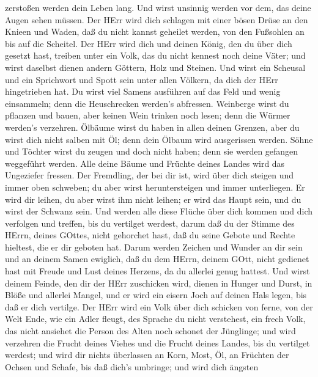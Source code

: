 zerstoßen werden dein Leben lang.  Und wirst unsinnig
werden vor dem, das deine Augen sehen müssen.  Der HErr
wird dich schlagen mit einer bösen Drüse an den Knieen und Waden, daß du
nicht kannst geheilet werden, von den Fußsohlen an bis auf die Scheitel.
 Der HErr wird dich und deinen König, den du über dich
gesetzt hast, treiben unter ein Volk, das du nicht kennest noch deine
Väter; und wirst daselbst dienen andern Göttern, Holz und Steinen.
 Und wirst ein Scheusal und ein Sprichwort und Spott sein
unter allen Völkern, da dich der HErr hingetrieben hat.  Du
wirst viel Samens ausführen auf das Feld und wenig einsammeln; denn die
Heuschrecken werden's abfressen.  Weinberge wirst du
pflanzen und bauen, aber keinen Wein trinken noch lesen; denn die Würmer
werden's verzehren.  Ölbäume wirst du haben in allen deinen
Grenzen, aber du wirst dich nicht salben mit Öl; denn dein Ölbaum wird
ausgerissen werden.  Söhne und Töchter wirst du zeugen und
doch nicht haben; denn sie werden gefangen weggeführt werden.
 Alle deine Bäume und Früchte deines Landes wird das
Ungeziefer fressen.  Der Fremdling, der bei dir ist, wird
über dich steigen und immer oben schweben; du aber wirst heruntersteigen
und immer unterliegen.  Er wird dir leihen, du aber wirst
ihm nicht leihen; er wird das Haupt sein, und du wirst der Schwanz sein.
 Und werden alle diese Flüche über dich kommen und dich
verfolgen und treffen, bis du vertilget werdest, darum daß du der Stimme
des HErrn, deines GOttes, nicht gehorchet hast, daß du seine Gebote und
Rechte hieltest, die er dir geboten hat.  Darum werden
Zeichen und Wunder an dir sein und an deinem Samen ewiglich,
 daß du dem HErrn, deinem GOtt, nicht gedienet hast mit
Freude und Lust deines Herzens, da du allerlei genug hattest.
 Und wirst deinem Feinde, den dir der HErr zuschicken wird,
dienen in Hunger und Durst, in Blöße und allerlei Mangel, und er wird
ein eisern Joch auf deinen Hals legen, bis daß er dich vertilge.
 Der HErr wird ein Volk über dich schicken von ferne, von
der Welt Ende, wie ein Adler fleugt, des Sprache du nicht verstehest,
 ein frech Volk, das nicht ansiehet die Person des Alten
noch schonet der Jünglinge;  und wird verzehren die Frucht
deines Viehes und die Frucht deines Landes, bis du vertilget werdest;
und wird dir nichts überlassen an Korn, Most, Öl, an Früchten der Ochsen
und Schafe, bis daß dich's umbringe;  und wird dich ängsten
